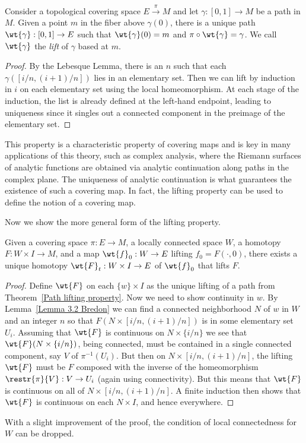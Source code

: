 \begin{thm}\label{Path lifting property}
    Consider a topological covering space $E\overset{\pi}{\to}M$ and let $\gamma:[0,1]\to M$ be a path in $M$. Given a point $m$ in the fiber above $\gamma(0)$, there is a unique path $\wt{\gamma}:[0,1]\to E$ such that $\wt{\gamma}(0)=m$ and $\pi\circ\wt{\gamma}=\gamma$. We call $\wt{\gamma}$ the \emph{lift} of $\gamma$ based at $m$.
\end{thm}
\begin{proof}
    By the Lebesque Lemma, there is an $n$ such that each $\gamma([i/n,(i+1)/n])$ lies in an elementary set. Then we can lift by induction in $i$ on each elementary set using the local homeomorphism. At each stage of the induction, the list is already defined at the left-hand endpoint, leading to uniqueness since it singles out a connected component in the preimage of the elementary set.
\end{proof}
This property is a characteristic property of covering maps and is key in many applications of this theory, such as complex analysis, where the Riemann surfaces of analytic functions are obtained via analytic continuation along paths in the complex plane. The uniqueness of analytic continuation is what guarantees the existence of such a covering map. In fact, the lifting property can be used to define the notion of a covering map.

Now we show the more general form of the lifting property.
\begin{thm}\label{homotopy lifting property}
    Given a covering space $\pi :E\to M$, a locally connected space $W$, a homotopy $F :W\times I\to M$, and a map $\wt{f}_0:W\to E$ lifting $f_0=F(\cdot ,0)$, there exists a unique homotopy $\wt{F}_t: W\times I\to E$ of $\wt{f}_0$ that lifts $F$.
\end{thm}
\begin{proof}
    Define $\wt{F}$ on each $\{w\}\times I$ as the unique lifting of a path from Theorem~\ref{Path lifting property}. Now we need to show continuity in $w$. By Lemma~\ref{Lemma 3.2 Bredon} we can find a connected neighborhood $N$ of $w$ in $W$ and an integer $n$ so that $F(N\times [i/n,(i+1)/n])$ is in some elementary set $U_i$. Assuming that $\wt{F}$ is continuous on $N\times \{i/n\}$ we see that $\wt{F}(N\times\{i/n\})$, being connected, must be contained in a  single connected component, say $V$ of $\pi^{-1}(U_i)$. But then on $N\times[i/n,(i+1)/n]$, the lifting $\wt{F}$ must be $F$ composed with the inverse of the homeomorphism $\restr{\pi}{V}:V\to U_i$ (again using connectivity). But this means that $\wt{F}$ is continuous on all of $N\times [i/n,(i+1)/n]$. A finite induction then shows that $\wt{F}$ is continuous on each $N\times I$, and hence everywhere.
\end{proof}
\begin{rem}
    With a slight improvement of the proof, the condition of local connectedness for $W$ can be dropped.
\end{rem}

